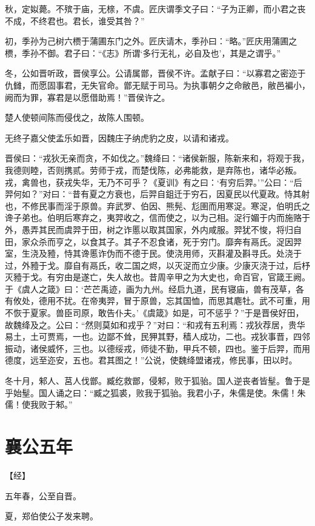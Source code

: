 \documentclass[a4paper,12pt,UTF8,twoside]{ctexbook}
\begin{document}
秋，定姒薨。不殡于庙，无榇，不虞。匠庆谓季文子曰：“子为正卿，而小君之丧不成，不终君也。君长，谁受其咎？”

初，季孙为己树六槚于蒲圃东门之外。匠庆请木，季孙曰：“略。”匠庆用蒲圃之槚，季孙不御。君子曰：“《志》所谓‘多行无礼，必自及也’，其是之谓乎。”

冬，公如晋听政，晋侯享公。公请属鄫，晋侯不许。孟献子曰：“以寡君之密迩于仇雠，而愿固事君，无失官命。鄫无赋于司马。为执事朝夕之命敝邑，敝邑褊小，阙而为罪，寡君是以愿借助焉！”晋侯许之。

楚人使顿间陈而侵伐之，故陈人围顿。

无终子嘉父使孟乐如晋，因魏庄子纳虎豹之皮，以请和诸戎。

晋侯曰：“戎狄无亲而贪，不如伐之。”魏绛曰：“诸侯新服，陈新来和，将观于我，我德则睦，否则携贰。劳师于戎，而楚伐陈，必弗能救，是弃陈也，诸华必叛。戎，禽兽也，获戎失华，无乃不可乎？《夏训》有之曰：‘有穷后羿。’”公曰：“后羿何如？”对曰：“昔有夏之方衰也，后羿自鉏迁于穷石，因夏民以代夏政。恃其射也，不修民事而淫于原兽。弃武罗、伯因、熊髡、尨圉而用寒浞。寒浞，伯明氏之谗子弟也。伯明后寒弃之，夷羿收之，信而使之，以为己相。浞行媚于内而施赂于外，愚弄其民而虞羿于田，树之诈慝以取其国家，外内咸服。羿犹不悛，将归自田，家众杀而亨之，以食其子。其子不忍食诸，死于穷门。靡奔有鬲氏。浞因羿室，生浇及豷，恃其谗慝诈伪而不德于民。使浇用师，灭斟灌及斟寻氏。处浇于过，外豷于戈。靡自有鬲氏，收二国之烬，以灭浞而立少康。少康灭浇于过，后杼灭豷于戈。有穷由是遂亡，失人故也。昔周辛甲之为大史也，命百官，官箴王阙。于《虞人之箴》曰：‘芒芒禹迹，画为九州。经启九道，民有寝庙，兽有茂草，各有攸处，德用不扰。在帝夷羿，冒于原兽，忘其国恤，而思其麀牡。武不可重，用不恢于夏家。兽臣司原，敢告仆夫。’《虞箴》如是，可不惩乎？”于是晋侯好田，故魏绛及之。公曰：“然则莫如和戎乎？”对曰：“和戎有五利焉：戎狄荐居，贵华易土，土可贾焉，一也。边鄙不耸，民狎其野，穑人成功，二也。戎狄事晋，四邻振动，诸侯威怀，三也。以德绥戎，师徒不勤，甲兵不顿，四也。鉴于后羿，而用德度，远至迩安，五也。君其图之！”公说，使魏绛盟诸戎，修民事，田以时。

冬十月，邾人、莒人伐鄫。臧纥救鄫，侵邾，败于狐骀。国人逆丧者皆髽。鲁于是乎始髽。国人诵之曰：“臧之狐裘，败我于狐骀。我君小子，朱儒是使。朱儒！朱儒！使我败于邾。”


\section{襄公五年}


【经】

五年春，公至自晋。

夏，郑伯使公子发来聘。
\end{document}
